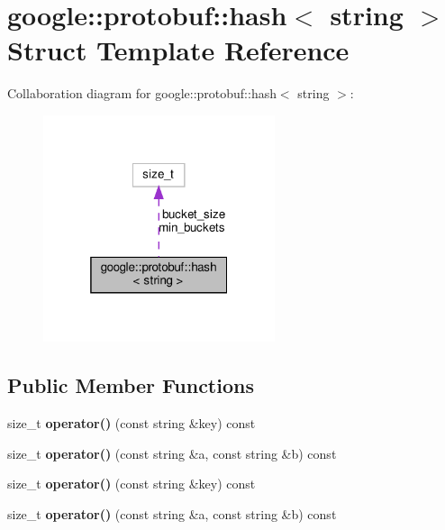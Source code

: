 \hypertarget{structgoogle_1_1protobuf_1_1hash_3_01string_01_4}{}\section{google\+:\+:protobuf\+:\+:hash$<$ string $>$ Struct Template Reference}
\label{structgoogle_1_1protobuf_1_1hash_3_01string_01_4}


Collaboration diagram for google\+:\+:protobuf\+:\+:hash$<$ string $>$\+:
\nopagebreak
\begin{figure}[H]
\begin{center}
\leavevmode
\includegraphics[width=193pt]{structgoogle_1_1protobuf_1_1hash_3_01string_01_4__coll__graph}
\end{center}
\end{figure}
\subsection*{Public Member Functions}
\begin{DoxyCompactItemize}
\item 
\mbox{\label{structgoogle_1_1protobuf_1_1hash_3_01string_01_4_a085af9087c276d958da99b679647c346}} 
size\+\_\+t {\bfseries operator()} (const string \&key) const
\item 
\mbox{\label{structgoogle_1_1protobuf_1_1hash_3_01string_01_4_ad77acba634b2082abdb27b9c7b131ae7}} 
size\+\_\+t {\bfseries operator()} (const string \&a, const string \&b) const
\item 
\mbox{\label{structgoogle_1_1protobuf_1_1hash_3_01string_01_4_a085af9087c276d958da99b679647c346}} 
size\+\_\+t {\bfseries operator()} (const string \&key) const
\item 
\mbox{\label{structgoogle_1_1protobuf_1_1hash_3_01string_01_4_ad77acba634b2082abdb27b9c7b131ae7}} 
size\+\_\+t {\bfseries operator()} (const string \&a, const string \&b) const
\end{DoxyCompactItemize}
